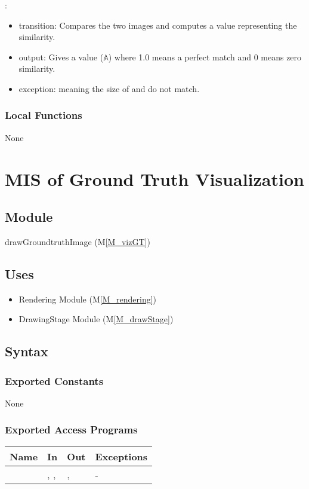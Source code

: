 \documentclass[12pt, titlepage]{article}
\newcommand{\mref}[1]{M\ref{#1}}
\newcommand{\mrefp}[1]{(\mref{#1})}
\newcommand{\mreff}[1]{Module \mrefp{#1}}
\begin{document}
\noindent {}:
\begin{itemize}
\item transition: Compares the two images and computes a value representing the similarity.
\item output: Gives a value ($\mathbb{A}$) where 1.0 means a perfect match and 0 means zero similarity.
\item exception:  meaning the size of  and
   do not match.
\end{itemize}

\subsubsection{Local Functions}
None

\newpage


\section{MIS of Ground Truth Visualization} \label{MS_vizGT}

\subsection{Module}
drawGroundtruthImage \mrefp{M_vizGT}

\subsection{Uses}
\begin{itemize}
  \item Rendering \mreff{M_rendering}
  \item DrawingStage \mreff{M_drawStage}
\end{itemize}

\subsection{Syntax}

\subsubsection{Exported Constants}
None
\subsubsection{Exported Access Programs}

\begin{center}
\begin{tabular}{L{5cm} L{4cm} L{4cm} L{2cm}}
\hline
\textbf{Name} & \textbf{In} & \textbf{Out} & \textbf{Exceptions} \\
\hline
{} & , , 
  & ,  & - \\
\hline
\end{tabular}
\end{center}
\end{document}
